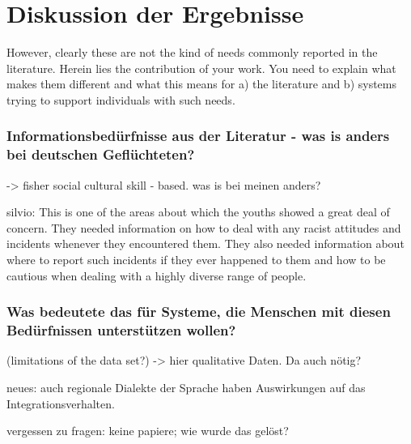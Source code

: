 \section{Diskussion der Ergebnisse}

However, clearly these are not the kind of needs commonly reported in the literature. Herein lies the contribution of your work. You need to explain what makes them different and what this means for a) the literature and b) systems trying to support individuals with such needs.


\subsubsection{Informationsbedürfnisse aus der Literatur - was is anders bei deutschen Geflüchteten?}

-> fisher social cultural skill - based. was is bei meinen anders?

silvio:
This is one of the areas about which the youths showed a great deal of concern. They
needed information on how to deal with any racist attitudes and incidents whenever
they encountered them. They also needed information about where to report such
incidents if they ever happened to them and how to be cautious when dealing with a
highly diverse range of people.

\subsubsection{Was bedeutete das für Systeme, die Menschen mit diesen Bedürfnissen unterstützen wollen?}



(limitations of the data set?) -> hier qualitative Daten. Da auch nötig?

neues: auch regionale Dialekte der Sprache haben Auswirkungen auf das Integrationsverhalten.

vergessen zu fragen: keine papiere; wie wurde das gelöst?